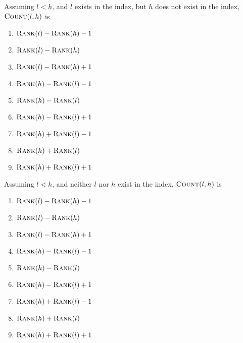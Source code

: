 \documentclass[12pt,twoside]{article}
\begin{document}
\begin{problems}
\begin{problemparts}
\problempart {} Assuming $l < h$, and $l$ exists in the index, but $h$
does not exist in the index, $\textnormal{\scshape Count}(l, h)$ is
\begin{enumerate}
  \item $\textnormal{\scshape Rank}(l) - \textnormal{\scshape Rank}(h) - 1$
  \item $\textnormal{\scshape Rank}(l) - \textnormal{\scshape Rank}(h)$
  \item $\textnormal{\scshape Rank}(l) - \textnormal{\scshape Rank}(h) + 1$
  \item $\textnormal{\scshape Rank}(h) - \textnormal{\scshape Rank}(l) - 1$
  \item $\textnormal{\scshape Rank}(h) - \textnormal{\scshape Rank}(l)$
  \item $\textnormal{\scshape Rank}(h) - \textnormal{\scshape Rank}(l) + 1$
  \item $\textnormal{\scshape Rank}(h) + \textnormal{\scshape Rank}(l) - 1$
  \item $\textnormal{\scshape Rank}(h) + \textnormal{\scshape Rank}(l)$
  \item $\textnormal{\scshape Rank}(h) + \textnormal{\scshape Rank}(l) + 1$
\end{enumerate}
\problempart {} Assuming $l < h$, and neither $l$ nor $h$ exist in the
index, $\textnormal{\scshape Count}(l, h)$ is
\begin{enumerate}
  \item $\textnormal{\scshape Rank}(l) - \textnormal{\scshape Rank}(h) - 1$
  \item $\textnormal{\scshape Rank}(l) - \textnormal{\scshape Rank}(h)$
  \item $\textnormal{\scshape Rank}(l) - \textnormal{\scshape Rank}(h) + 1$
  \item $\textnormal{\scshape Rank}(h) - \textnormal{\scshape Rank}(l) - 1$
  \item $\textnormal{\scshape Rank}(h) - \textnormal{\scshape Rank}(l)$
  \item $\textnormal{\scshape Rank}(h) - \textnormal{\scshape Rank}(l) + 1$
  \item $\textnormal{\scshape Rank}(h) + \textnormal{\scshape Rank}(l) - 1$
  \item $\textnormal{\scshape Rank}(h) + \textnormal{\scshape Rank}(l)$
  \item $\textnormal{\scshape Rank}(h) + \textnormal{\scshape Rank}(l) + 1$
\end{enumerate}
\end{problemparts}


\end{problems}
\end{document}

